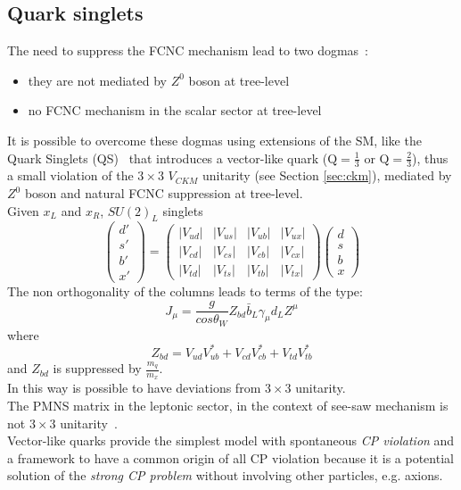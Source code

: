 \subsection{Quark singlets}
The need to suppress the FCNC mechanism lead to two dogmas~\cite{glash_fcnc,pashos}:
\begin{itemize}
	\item they are not mediated by $Z^0$ boson at tree-level
	\item no FCNC mechanism in the scalar sector at tree-level 
\end{itemize}
It is possible to overcome these dogmas using extensions of the SM, like the Quark Singlets (QS)~\cite{barger} that introduces a vector-like quark ($\mathrm{Q=\frac{1}{3}}$ or $\mathrm{Q=\frac{2}{3}}$), thus a small violation of the $\mathrm{3 \times 3}$ $V_{CKM}$ unitarity (see Section \ref{sec:ckm}), mediated by $Z^0$ boson and natural 
FCNC suppression at tree-level.
\vspace{\baselineskip}
\\Given $x_L$ and $x_R$, $SU(2)_{L}$ singlets
\begin{equation}
\begin{pmatrix}
d' \\ 
s' \\ 
b' \\
x' 
\end{pmatrix} 
=
\begin{pmatrix}
|V_{ud}| & |V_{us}| & |V_{ub}|  & |V_{ux}| \\ 
|V_{cd}| & |V_{cs}| & |V_{cb}|   & |V_{cx}| \\ 
|V_{td}| & |V_{ts}|  &| V_{tb}|   & |V_{tx}|
\end{pmatrix} 
\begin{pmatrix}
d \\ 
s \\ 
b \\
x
\end{pmatrix} 
\end{equation}
The non orthogonality of the columns leads to terms of the type:
\begin{equation}
J_{\mu}= \frac{g}{cos\theta_W}Z_{bd}\bar{b}_{L}\gamma_{\mu}d_{L}Z^{\mu}
\end{equation}
where
\begin{equation}
Z_{bd}=V_{ud}V^*_{ub}+V_{cd}V^*_{cb}+V_{td}V^*_{tb}
\end{equation}
and $Z_{bd}$ is suppressed by $\frac{m_q}{m_x}$.
\vspace{\baselineskip}
\\In this way is possible to have deviations from $\mathrm{3 \times 3}$ unitarity.\\
The PMNS matrix in the leptonic sector, in the context of see-saw mechanism is not  $\mathrm{3 \times 3}$ unitarity~\cite{pnms}.
\\Vector-like quarks provide the simplest model with spontaneous \textit{CP violation} and a framework to have a common origin
of all CP violation because it is a potential solution of the \textit{strong CP problem} without involving other particles, e.g. axions.

